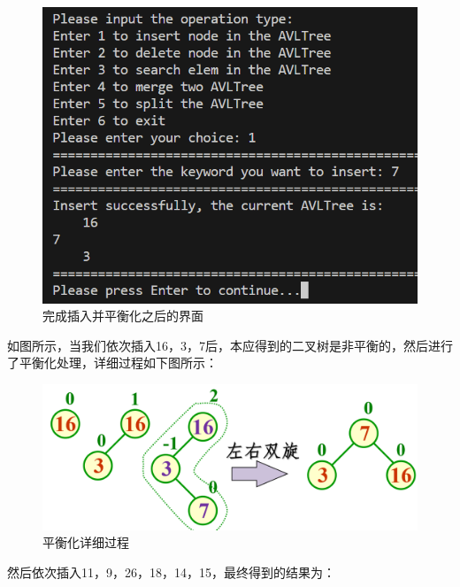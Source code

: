 \begin{figure}[H]
  \centering
  \includegraphics[width=13cm]{fig/AVLTree18.png}
  \caption{完成插入并平衡化之后的界面}
\end{figure}

如图所示，当我们依次插入16，3，7后，本应得到的二叉树是非平衡的，然后进行了平衡化处理，详细过程如下图所示：

\begin{figure}[H]
  \centering
  \includegraphics[width=13cm]{fig/AVLTree26.png}
  \caption{平衡化详细过程}
\end{figure}

然后依次插入11，9，26，18，14，15，最终得到的结果为：

